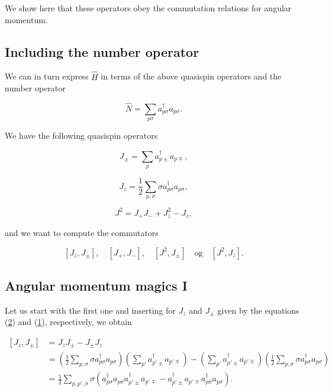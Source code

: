 \documentclass[11pt]{article}
\begin{document}
    We show here that these operators obey the commutation relations for
angular momentum.

    \hypertarget{including-the-number-operator}{%
\subsection{Including the number
operator}\label{including-the-number-operator}}

We can in turn express \(\hat{H}\) in terms of the above quasispin
operators and the number operator

    \[
\hat{N}=\sum_{p\sigma}
a_{p\sigma}^{\dagger}a_{p\sigma}.
\]

    We have the following quasispin operators

    \hypertarget{eq:Jpm}{}

\[
\begin{equation}
J_{\pm} = \sum_p a_{p\pm}^\dagger a_{p\mp},
\label{eq:Jpm} \tag{1} 
\end{equation}
\]

    \hypertarget{eq:Jz}{}

\[
\begin{equation} 
J_{z} = \frac{1}{2}\sum_{p,\sigma} \sigma a_{p\sigma}^\dagger a_{p\sigma},
\label{eq:Jz} \tag{2} 
\end{equation}
\]

    \hypertarget{eq:J2}{}

\[
\begin{equation} 
J^{2} = J_+ J_- + J_z^2 - J_z,
\label{eq:J2} \tag{3}
\end{equation}
\]

    and we want to compute the commutators

    \[
[J_z,J_\pm], \quad [J_+,J_-], \quad [J^2,J_\pm] \quad \text{og} \quad 
[J^2,J_z].
\]

    \hypertarget{angular-momentum-magics-i}{%
\subsection{Angular momentum magics I}\label{angular-momentum-magics-i}}

Let us start with the first one and inserting for \(J_z\) and \(J_\pm\)
given by the equations (\hyperref[eqjz]{2}) and (\hyperref[eqjpm]{1}),
respectively, we obtain

    \[
\begin{align*}
[J_z,J_\pm] &= J_z J_\pm - J_\pm J_z \\
%
&= \left( \frac{1}{2}\sum_{p,\sigma} \sigma a_{p\sigma}^\dagger a_{p\sigma} \right)
\left( \sum_{p'} a_{p'\pm}^\dagger a_{p'\mp} \right) -
\left( \sum_{p'} a_{p'\pm}^\dagger a_{p'\mp} \right)
\left( \frac{1}{2}\sum_{p,\sigma} \sigma a_{p\sigma}^\dagger a_{p\sigma} \right) \\
&= \frac{1}{2} \sum_{p,p',\sigma} \sigma \left( a_{p\sigma}^\dagger a_{p\sigma} a_{p'\pm}^\dagger a_{p'\mp} - a_{p'\pm}^\dagger a_{p'\mp} a_{p\sigma}^\dagger a_{p\sigma} \right).
\end{align*}
\]
\end{document}
